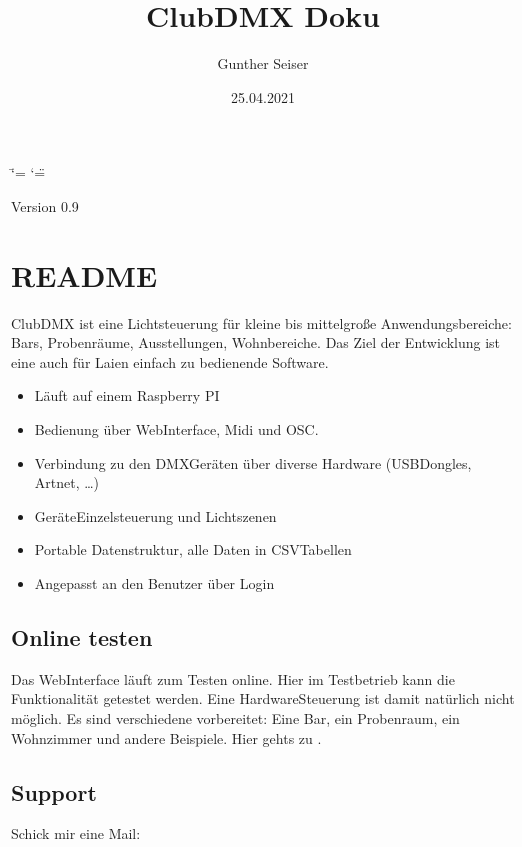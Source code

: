 \documentclass[letterpaper,10pt,ngerman]{sphinxmanual}
\title{ClubDMX Doku}
\date{25.04.2021}
\author{Gunther Seiser}
\begin{document}
\ifdefined\shorthandoff
  \ifnum\catcode`\=\string=\active\shorthandoff{=}\fi
  \ifnum\catcode`\"=\active{}\fi
\fi

\pagestyle{empty}
\sphinxmaketitle
\pagestyle{plain}
\sphinxtableofcontents
\pagestyle{normal}
\label{\detokenize{inhalt::doc}}


Version 0.9


\chapter{README}
\label{\detokenize{readme:readme}}\label{\detokenize{readme::doc}}
ClubDMX ist eine Lichtsteuerung für kleine bis mittelgroße Anwendungsbereiche:
Bars, Probenräume, Ausstellungen, Wohnbereiche. Das Ziel der Entwicklung ist
eine auch für Laien einfach zu bedienende Software.
\begin{itemize}
\item {} 
Läuft auf einem Raspberry PI

\item {} 
Bedienung über Web\sphinxhyphen{}Interface, Midi und OSC.

\item {} 
Verbindung zu den DMX\sphinxhyphen{}Geräten über diverse Hardware
(USB\sphinxhyphen{}Dongles, Artnet, …)

\item {} 
Geräte\sphinxhyphen{}Einzelsteuerung und Lichtszenen

\item {} 
Portable Datenstruktur, alle Daten in CSV\sphinxhyphen{}Tabellen

\item {} 
Angepasst an den Benutzer über Login

\end{itemize}


\section{Online testen}
\label{\detokenize{readme:online-testen}}
Das Web\sphinxhyphen{}Interface läuft zum Testen online. Hier im Testbetrieb kann die
Funktionalität getestet werden. Eine Hardware\sphinxhyphen{}Steuerung ist damit natürlich
nicht möglich. Es sind verschiedene  vorbereitet: Eine Bar,
ein Probenraum, ein Wohnzimmer und andere Beispiele. Hier gehts zu
 .


\section{Support}
\label{\detokenize{readme:support}}
Schick mir eine Mail: 
\end{document}
